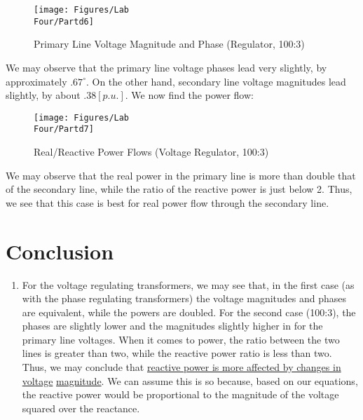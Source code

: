 \documentclass[
	letterpaper, %
	10pt, %
]{CSUniSchoolLabReport}
\begin{document}
\begin{figure}[H]
  \centering
  \texttt{[image: Figures/Lab\\ Four/Partd6]}
  \caption{Primary Line Voltage Magnitude and Phase (Regulator, 100:3)}
  \label{fig:6}
\end{figure}

We may observe that the primary line voltage phases lead very slightly, by approximately $.67^{\circ}$. On the other hand, secondary line voltage magnitudes lead slightly, by about $.38[p.u.]$. We now find the power flow:

\begin{figure}[H]
  \centering
  \texttt{[image: Figures/Lab\\ Four/Partd7]}
  \caption{Real/Reactive Power Flows (Voltage Regulator, 100:3)}
  \label{fig:7}
\end{figure}

We may observe that the real power in the primary line is more than double that of the secondary line, while the ratio of the reactive power is just below 2. Thus, we see that this case is best for real power flow through the secondary line.

\section{Conclusion}

\begin{enumerate}

  \item For the voltage regulating transformers, we may see that, in the first case (as with the phase regulating transformers) the voltage magnitudes and phases are equivalent, while the powers are doubled. For the second case (100:3), the phases are slightly lower and the magnitudes slightly higher in for the primary line voltages. When it comes to power, the ratio between the two lines is greater than two, while the reactive power ratio is less than two. Thus, we may conclude that \underline{reactive power is more affected by changes in voltage} \underline{magnitude}. We can assume this is so because, based on our equations, the reactive power would be proportional to the magnitude of the voltage squared over the reactance.

\end{enumerate}
\end{document}
